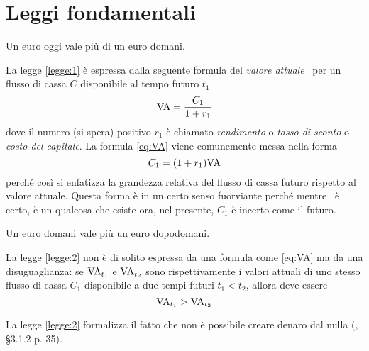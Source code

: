 
\chapter{Leggi fondamentali}
\label{chap:Leggi_fondamentali}

\begin{legge}\label{legge:1}
  Un euro oggi vale più di un euro domani.
\end{legge}

La legge \ref{legge:1} è espressa dalla seguente formula del \emph{valore attuale}
\VA\ per un flusso di cassa  $C$ disponibile al tempo futuro $t_1$
\begin{equation}
  \label{eq:VA}
  \mathrm{VA}=\frac{C_1}{1+r_1}
\end{equation}
dove il numero (si spera) positivo $r_1$ è chiamato \emph{rendimento} o \emph{tasso di sconto} o
\emph{costo del capitale}.
La formula \eqref{eq:VA} viene comunemente messa nella forma
\[
  C_1=(1+r_1)\mathrm{VA}
\]
perché così si enfatizza la grandezza relativa del flusso di cassa futuro rispetto al valore attuale.
Questa forma è in un certo senso fuorviante perché mentre \VA\ è certo, è un qualcosa che esiste ora,
nel presente, $C_1$ è incerto come il futuro.


\begin{legge}\label{legge:2}
  Un euro domani vale più un euro dopodomani.
\end{legge}

La legge \ref{legge:2} non è di solito espressa da una formula come \eqref{eq:VA} ma da una disuguaglianza:
se $\mathrm{VA}_{t_1}$ e $\mathrm{VA}_{t_2}$ sono rispettivamente i valori attuali di uno stesso flusso di cassa $C_1$ disponibile
a due tempi futuri $t_1<t_2$, allora deve essere
\begin{equation}
  \label{eq:legge2}
  \mathrm{VA}_{t_1}>\mathrm{VA}_{t_2}
\end{equation}

La legge \ref{legge:2} formalizza il fatto che non è possibile creare denaro dal nulla (\cite{brealey_et_al1999},
§3.1.2 p. 35).
